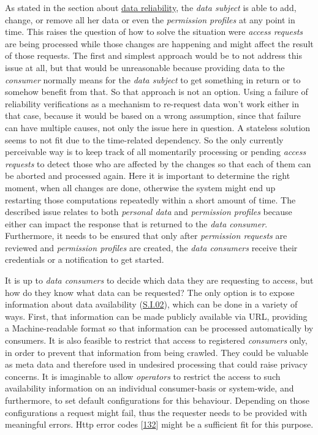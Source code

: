 \documentclass[12pt,english,a4paper,titlepage,cleardoublepage=empty,dottedtoc]{report}
\begin{document}
As stated in the section about \protect\hyperlink{data-reliability}{data
reliability}, the \emph{data subject} is able to add, change, or remove
all her data or even the \emph{permission profiles} at any point in
time. This raises the question of how to solve the situation were
\emph{access requests} are being processed while those changes are
happening and might affect the result of those requests. The first and
simplest approach would be to not address this issue at all, but that
would be unreasonable because providing data to the \emph{consumer}
normally means for the \emph{data subject} to get something in return or
to somehow benefit from that. So that approach is not an option. Using a
failure of reliability verifications as a mechanism to re-request data
won't work either in that case, because it would be based on a wrong
assumption, since that failure can have multiple causes, not only the
issue here in question. A stateless solution seems to not fit due to the
time-related dependency. So the only currently perceivable way is to
keep track of all momentarily processing or pending \emph{access
requests} to detect those who are affected by the changes so that each
of them can be aborted and processed again. Here it is important to
determine the right moment, when all changes are done, otherwise the
system might end up restarting those computations repeatedly within a
short amount of time. The described issue relates to both \emph{personal
data} and \emph{permission profiles} because either can impact the
response that is returned to the \emph{data consumer}. Furthermore, it
needs to be ensured that only after \emph{permission requests} are
reviewed and \emph{permission profiles} are created, the \emph{data
consumers} receive their credentials or a notification to get started.

It is up to \emph{data consumers} to decide which data they are
requesting to access, but how do they know what data can be requested?
The only option is to expose information about data availability
(\protect\hyperlink{si02}{S.I.02}), which can be done in a variety of
ways. First, that information can be made publicly available via URL,
providing a Machine-readable format so that information can be processed
automatically by consumers. It is also feasible to restrict that access
to registered \emph{consumers} only, in order to prevent that
information from being crawled. They could be valuable as meta data and
therefore used in undesired processing that could raise privacy
concerns. It is imaginable to allow \emph{operators} to restrict the
access to such availability information on an individual consumer-basis
or system-wide, and furthermore, to set default configurations for this
behaviour. Depending on those configurations a request might fail, thus
the requester needs to be provided with meaningful errors. Http error
codes {[}\protect\hyperlink{ref-web_spec_http-error-codes}{132}{]} might
be a sufficient fit for this purpose.
\end{document}
